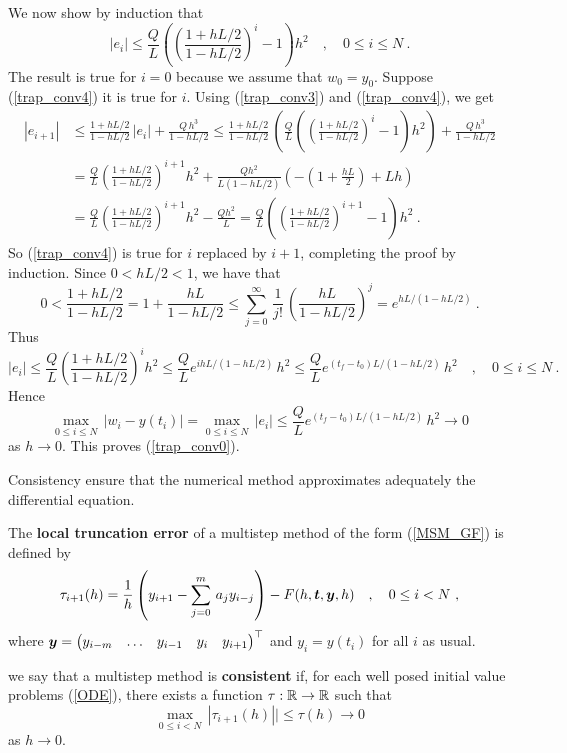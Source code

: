\begin{rmk}
We now show by induction that
\begin{equation} \label{trap_conv4}
|e_i|  \leq \frac{Q}{L}\left( \left(
\frac{1+ hL/2}{1-hL/2} \right)^i -1 \right)h^2
\quad , \quad 0 \leq i \leq N \ .
\end{equation}
The result is true for $i=0$ because we assume that
$w_0 = y_0$.  Suppose (\ref{trap_conv4}) it is true
for $i$.  Using (\ref{trap_conv3}) and (\ref{trap_conv4}), we get
\begin{align*}
|e_{i+1}| &\leq \frac{1+ hL/2}{1-hL/2}\,|e_i|
+\frac{Q\,h^3}{1- hL/2} \leq \frac{1+ hL/2}{1- hL/2}\,
\left(\frac{Q}{L}\left(\left( \frac{1+ hL/2}{1- hL/2}\right)^i
 -1 \right)h^2\right) +\frac{Q\,h^3}{1-hL/2} \\
&= \frac{Q}{L}\left(\frac{1+ hL/2}{1- hL/2}\right)^{i+1}
h^2 + \frac{Q h^2}{L(1- hL/2)}
\left(-\left(1+ \frac{hL}{2}\right)+L h\right) \\
&= \frac{Q}{L}\left(\frac{1+ hL/2}{1- hL/2}\right)^{i+1}
h^2 - \frac{Q h^2}{L}
= \frac{Q}{L}\left( \left(\frac{1+hL/2}{1-hL/2}\right)^{i+1} -1 \right) h^2
\ .
\end{align*}
So (\ref{trap_conv4}) is true for $i$ replaced by $i+1$, completing
the proof by induction.  Since $0 < hL/2 < 1$, we have that
\[
0 < \frac{1+hL/2}{1-hL/2} =
1 + \frac{hL}{1- hL/2} \leq
\sum_{j=0}^\infty\, \frac{1}{j!}\,
\left( \frac{hL}{1 - hL/2} \right)^j =
e^{hL/(1-hL/2)} \ .
\]
Thus
\[
|e_i| \leq \frac{Q}{L}
\left(\frac{1+hL/2}{1 - hL/2}\right)^i
h^2 \leq \frac{Q}{L} e^{ihL/(1-hL/2)}\,h^2
\leq \frac{Q}{L} e^{(t_f-t_0)L/(1-hL/2)}\,h^2
\quad, \quad 0 \leq i \leq N \ .
\]
Hence
\[
\max_{0\leq i \leq N}\,|w_i-y(t_i)| = \max_{0\leq i \leq N}\,|e_i|
\leq \frac{Q}{L} e^{(t_f-t_0)L/(1-hL/2)}\,h^2 \to 0
\]
as $h \rightarrow 0$.  This proves (\ref{trap_conv0}).
\label{ConvAltern}
\end{rmk}

Consistency ensure that the numerical method approximates adequately
the differential equation.

\begin{defn}
The {\bfseries local truncation error} of
a multistep method of the form (\ref{MSM_GF}) is defined by
\[
\tau_{i+1}(h) = \frac{1}{h} \left( y_{i+1} - \sum_{j=0}^m\,a_j y_{i-j} \right)
- F(h,\bm{t},\bm{y}, h) \quad , \quad 0 \leq i < N \ ,
\]
where
$\displaystyle \bm{y}
= \begin{pmatrix} y_{i-m} & \ldots & y_{i-1} & y_i & y_{i+1}
\end{pmatrix}^\top$ and $y_i = y(t_i)$ for all $i$ as usual.

we say that a multistep method is
{\bfseries consistent} if, for each
well posed initial value problems (\ref{ODE}), there exists a function
$\tau:\mathbb{R}\to \mathbb{R}$ such that
\[
\max_{0 \leq i < N} \, |\tau_{i+1}(h)| | \leq \tau(h) \to 0
\]
as $h\to 0$.  \label{methodCons}
\end{defn}

